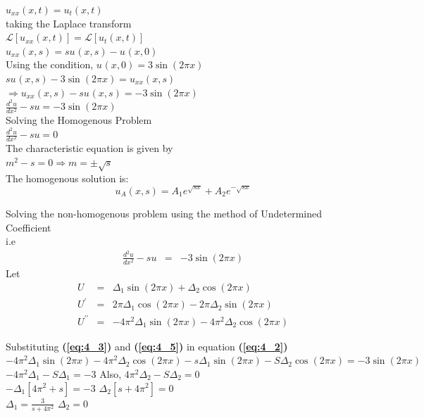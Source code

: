 \documentclass[12pt]{report}
\newcommand{\Laplace}{\mathcal{L}}
\newcommand{\sbracket}[1]{\left[#1\right]}
\newcommand{\Un}[2]{u_{#1}(#2)}
\newcommand{\NI}{\noindent}
\newcommand{\LFn}[1]{\Laplace \sbracket{#1}}
\newcommand{\Dtl}[1]{\Delta_{#1}}
\newcommand{\bt}[1]{\textbf{#1}}
\newcommand{\refn}[1]{\bt{(\ref{#1})}}
\begin{document}
\NI $\Un{xx}{x,t} = \Un{t}{x,t}$\\[0.2cm]
taking the Laplace transform \\[0.2cm]
$\LFn{\Un{xx}{x,t}} = \LFn{\Un{t}{x,t}}$\\[0.2cm]
$\Un{xx}{x,s} = s\Un{}{x,s} - \Un{}{x,0}$\\[0.7cm]
Using the condition, $\Un{}{x,0} = 3\sin(2\pi x)$ \\[0.2cm]
$s\Un{}{x,s} - 3\sin(2\pi x) = \Un{xx}{x,s}$ \\[0.2cm]
$\Longrightarrow \Un{xx}{x,s} - s\Un{}{x,s} = - 3\sin(2\pi x)$ \\[0.2cm]
${\displaystyle \frac{d^{2}u}{dx^{2}} - su = - 3\sin(2\pi x)}$\\[0.7cm]
Solving the Homogenous Problem \\[0.2cm]
${\displaystyle \frac{d^{2}u}{dx^{2}} - su = 0}$\\[0.7cm]
The characteristic equation is given by \\[0.2cm]
$m^2 - s = 0 \Rightarrow m = \pm \sqrt{s}$ \\[0.2cm]

\NI The homogenous solution is: \\[0.2cm]
\begin{equation}
	\Un{A}{x,s} = A_{1}e^{\sqrt{sx}} + A_{2}e^{-\sqrt{sx}}
\end{equation}

\NI Solving the non-homogenous problem using the method of Undetermined Coefficient \\[0.2cm]
i.e
\begin{eqnarray}
	\frac{d^{2}u}{dx^{2}} - su &=& - 3\sin(2\pi x) \label{eq:4_2}
\end{eqnarray}
Let
\begin{eqnarray}
	U &=& \Delta_{1}\sin(2\pi x) + \Delta_{2}\cos(2\pi x) \label{eq:4_3}\\
	U^{\prime} &=& 2\pi \Delta_{1}\cos(2\pi x) - 2\pi \Delta_{2}\sin(2\pi x)\label{eq:4_4}\\
	U^{\prime\prime} &=& -4\pi^{2} \Delta_{1}\sin(2\pi x) - 4\pi^2\Delta_2\cos(2\pi x)\label{eq:4_5}
\end{eqnarray}

\NI Substituting \refn{eq:4_3} and \refn{eq:4_5} in equation \refn{eq:4_2} \\[0.2cm]
$-4\pi^{2}\Dtl{1}\sin(2\pi x) - 4\pi^{2}\Dtl{2}\cos(2\pi x) - s\Dtl{1}\sin(2\pi x) - S\Dtl{2}\cos(2\pi x) = -3\sin(2\pi x)$ \\[0.2cm]
$-4\pi^{2}\Dtl{1} - S\Dtl{1} = - 3$  \quad \quad \quad Also, $4\pi^{2}\Dtl{2} - S\Dtl{2} = 0$ \\[0.2cm]
$-\Dtl{1}\sbracket{4\pi^{2} + s} = - 3 $ \quad \quad \quad \quad \quad \quad $\Dtl{2}\sbracket{s + 4\pi^{2}} = 0$ \\[0.2cm]
$\Dtl{1} = \displaystyle \frac{3}{s + 4\pi^{2}} $ \quad \quad \quad \quad \quad \quad \quad  \quad \quad $\Dtl{2} = 0$ \\[0.2cm]
\end{document}
